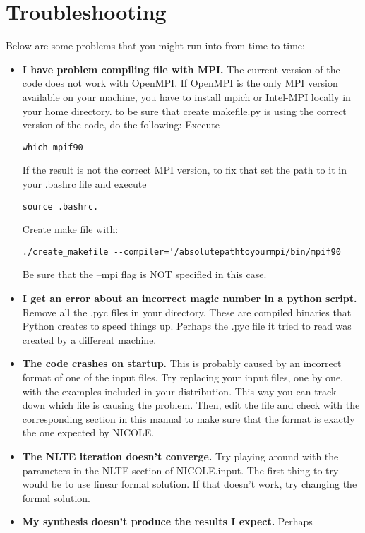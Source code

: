 \chapter{Troubleshooting}
Below are some problems that you might run into from time to time:

\begin{itemize}

\item {\bf I have problem compiling file with MPI.} The current
  version of the code does not work with OpenMPI. If OpenMPI is the
  only MPI version available on your machine, you have to install
  mpich or Intel-MPI locally in your home directory.  to be sure that
  create$\_$makefile.py is using the correct version of the code, do the
  following: 
Execute
\begin{verbatim}
which mpif90
\end{verbatim}
If the result is not the correct MPI version, to fix that set the path to it in your .bashrc file and execute
\begin{verbatim}
source .bashrc.  
\end{verbatim}
Create make file with:
 \begin{verbatim}
./create_makefile --compiler='/absolutepathtoyourmpi/bin/mpif90
 \end{verbatim}
Be sure that the --mpi flag is NOT specified in this case.
\item {\bf I get an error about an incorrect magic number in a python
  script.} Remove all the .pyc files in your directory. These are
  compiled binaries that Python creates to speed things up. Perhaps
  the .pyc file it tried to read was created by a different machine.
\item {\bf The code crashes on startup.} This is probably caused by an
  incorrect format of one of the input files. Try replacing your input
  files, one by one, with the examples included in your
  distribution. This way you can track down which file is causing the
  problem.  Then, edit the file and check with the corresponding
  section in this manual to make sure that the format is exactly the
  one expected by NICOLE.
\item {\bf The NLTE iteration doesn't converge.} Try playing around
  with the parameters in the NLTE section of NICOLE.input. The first
  thing to try would be to use linear formal solution. If that doesn't
  work, try changing the formal solution.
\item {\bf My synthesis doesn't produce the results I expect.} Perhaps

\end{itemize}
